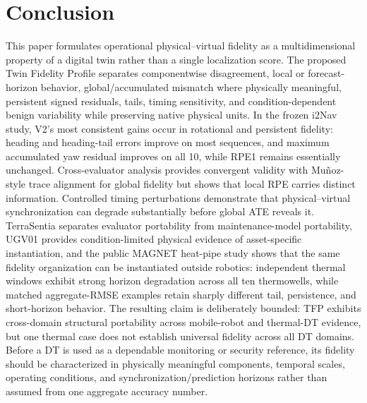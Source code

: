 \documentclass[journal]{IEEEtran}
\begin{document}
\section{Conclusion}
This paper formulates operational physical--virtual fidelity as a multidimensional property of a digital twin rather than a single localization score. The proposed Twin Fidelity Profile separates componentwise disagreement, local or forecast-horizon behavior, global/accumulated mismatch where physically meaningful, persistent signed residuals, tails, timing sensitivity, and condition-dependent benign variability while preserving native physical units. In the frozen i2Nav study, V2's most consistent gains occur in rotational and persistent fidelity: heading and heading-tail errors improve on most sequences, and maximum accumulated yaw residual improves on all 10, while RPE1 remains essentially unchanged. Cross-evaluator analysis provides convergent validity with Mu\~noz-style trace alignment for global fidelity but shows that local RPE carries distinct information. Controlled timing perturbations demonstrate that physical--virtual synchronization can degrade substantially before global ATE reveals it. TerraSentia separates evaluator portability from maintenance-model portability, UGV01 provides condition-limited physical evidence of asset-specific instantiation, and the public MAGNET heat-pipe study shows that the same fidelity organization can be instantiated outside robotics: independent thermal windows exhibit strong horizon degradation across all ten thermowells, while matched aggregate-RMSE examples retain sharply different tail, persistence, and short-horizon behavior. The resulting claim is deliberately bounded: TFP exhibits cross-domain structural portability across mobile-robot and thermal-DT evidence, but one thermal case does not establish universal fidelity across all DT domains. Before a DT is used as a dependable monitoring or security reference, its fidelity should be characterized in physically meaningful components, temporal scales, operating conditions, and synchronization/prediction horizons rather than assumed from one aggregate accuracy number.
\end{document}
